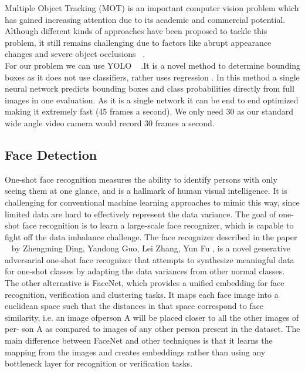 \documentclass[10pt,twocolumn,letterpaper]{article}
\begin{document}
Multiple Object Tracking (MOT) is an important computer vision problem which has gained increasing attention due to
its academic and commercial potential. Although different kinds of approaches have been proposed to tackle this problem, it still
remains challenging due to factors like abrupt appearance changes and severe object occlusions ~\cite{b6}.
\\
For our problem we can use YOLO ~\cite{b4} .It is a novel method to determine bounding boxes as it does not use classifiers, rather uses regression . In this method a single neural network predicts bounding boxes and class probabilities directly from full images in one evaluation. As it is a single network it can be end to end optimized making it extremely fast (45 frames a second). We only need 30 as our standard wide angle video camera would record 30 frames a second.


\subsection{Face Detection}

One-shot face recognition measures the ability to identify persons with only seeing them at one glance, and is a hallmark of human visual intelligence. It is challenging for conventional machine learning approaches to mimic this way, since limited data are hard to effectively represent the data variance. The goal of one-shot face recognition is to learn a large-scale face recognizer, which is capable to fight off the data imbalance challenge. The face recognizer described in the paper ~\cite{b3} by Zhengming Ding, Yandong Guo, Lei Zhang, Yun Fu , is a novel generative adversarial one-shot face recognizer that attempts to synthesize meaningful data for one-shot classes by adapting the data variances from other normal classes.
The other alternative is FaceNet, which provides a unified embedding for face
recognition, verification and clustering tasks. It maps each
face image into a euclidean space such that the distances
in that space correspond to face similarity, i.e. an image ofperson A will be placed closer to all the other images of per-
son A as compared to images of any other person present in
the dataset. The main difference between FaceNet and other
techniques is that it learns the mapping from the images and
creates embeddings rather than using any bottleneck layer
for recognition or verification tasks. 

\end{document}
